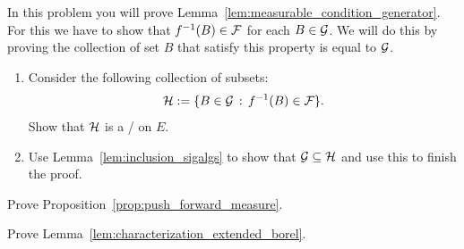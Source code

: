 \begin{problem}\label{prb:measurable_condition_generator}
In this problem you will prove Lemma~\ref{lem:measurable_condition_generator}. For this we have to show that $f^{-1}(B) \in \mathcal F$ for each $B \in \mathcal G$. We will do this by proving the collection of set $B$ that satisfy this property is equal to $\mathcal G$.

\begin{enumerate}[label=(\alph*)]
\item Consider the following collection of subsets:
\[
	\mathcal H := \{B \in \mathcal G \, : \, f^{-1}(B) \in \mathcal F\}.
\]
Show that $\mathcal H$ is a \sigalg/ on $E$.
\item Use Lemma~\ref{lem:inclusion_sigalgs} to show that $\mathcal G \subseteq \mathcal H$ and use this to finish the proof.
\end{enumerate}
%
%
%
\end{problem}

\begin{problem}\label{prb:push_forward_measure}
Prove Proposition~\ref{prop:push_forward_measure}.
\end{problem}

\begin{problem}\label{prb:characterization_extended_borel}
Prove Lemma~\ref{lem:characterization_extended_borel}.
\end{problem}

